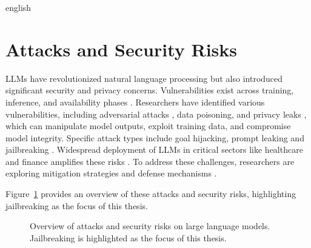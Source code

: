 \begin{otherlanguage*}{english}
\begin{figure}[htbp!]
\end{figure}

\section{Attacks and Security Risks}

LLMs have revolutionized natural language processing but also introduced significant security and privacy concerns. Vulnerabilities exist across training, inference, and availability phases \cite{Xu2025Survey}. Researchers have identified various vulnerabilities, including adversarial attacks \cite{Schwinn2023Adversarial}, data poisoning, and privacy leaks \cite{Das2025Security}, which can manipulate model outputs, exploit training data, and compromise model integrity. Specific attack types include goal hijacking, prompt leaking and jailbreaking \cite{Perez2022Ignore, shayeganiSurveyVulnerabilitiesLarge2023}. Widespread deployment of LLMs in critical sectors like healthcare and finance amplifies these risks \cite{Debar2024Emerging}. To address these challenges, researchers are exploring mitigation strategies and defense mechanisms \cite{abdaliSecuringLargeLanguage2024a}.


Figure~\ref{fig:overview-attacks} provides an overview of these attacks and security risks, highlighting jailbreaking as the focus of this thesis.

\begin{figure}[ht!]
\centering
\caption[Overview of attacks and security risks on large language models]{Overview of attacks and security risks on large language models. Jailbreaking is highlighted as the focus of this thesis.}
\label{fig:overview-attacks}
\end{figure}
\end{otherlanguage*}
